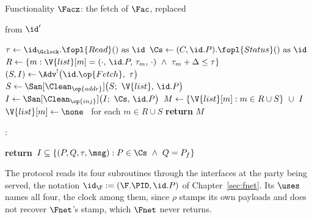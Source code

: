 \documentclass[10pt,oneside,openany]{book}
\theoremstyle{accentdef}
\theoremstyle{accentplain}
\begin{document}
\begin{interface}[nofloat]{Functionality $\Facz$: the fetch of $\Fac$, replaced \\
}

{\scriptsize
{} \quad from $\id'$
\begin{algorithmic}[1]
\State $\tau \gets \id_{\Gclock}.\fopl{Read}() \text{ as } \id$
\State $\Cs \gets (C,\id.P).\fopl{Status}() \text{ as } \id$
\State $R \gets \{m : \V{list}[m] = (\cdot,\, \id.P,\, \tau_m,\, \cdot) \ \wedge\ \tau_m + \Delta \leq \tau\}$
\State $(S, I) \gets \Adv^{!}\bigl(\id.\op{Fetch},\ \tau\bigr)$ \label{ln:aczquery}
\State $S \gets \San[\Clean_{\op{addr}}]\bigl(S;\ \V{list},\, \id.P\bigr)$
\State $I \gets \San[\Clean_{\op{inj}}]\bigl(I;\ \Cs,\, \id.P\bigr)$ \label{ln:aczsan}
\State $M \gets \{\V{list}[m] : m \in R \cup S\} \ \cup\ I$ \label{ln:aczdeliver}
\State $\V{list}[m] \gets \none$ \ for each $m \in R \cup S$
\State \textbf{return} $M$
\end{algorithmic}
\vspace{1.0ex}
:
\begin{algorithmic}[1]
\State \textbf{return}\ $I \subseteq \{(P,Q,\tau,\msg) : P \in \Cs \ \wedge\ Q = P_f\}$
\end{algorithmic}}
\end{interface}

The protocol reads its four subroutines through the interfaces at the party being served, the
notation $\id_{\F} := (\F.\PID,\id.P)$ of Chapter~\ref{sec:fnet}. Its $\uses$ names all four,
the clock among them, since $\rho$ stamps its own payloads and does not recover $\Fnet$'s stamp,
which $\Fnet$ never returns.
\end{document}
